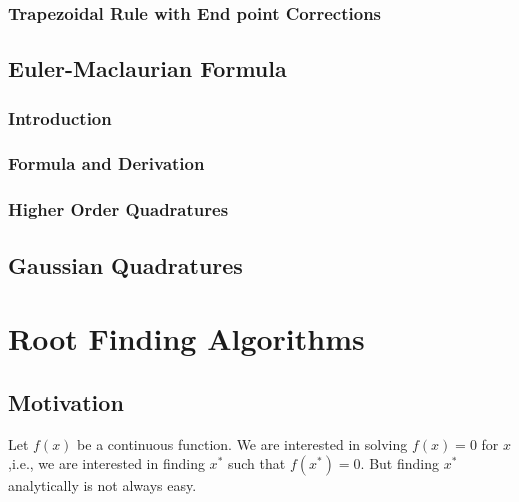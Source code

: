 \documentclass[
]{book}
\begin{document}
\hypertarget{trapezoidal-rule-with-end-point-corrections}{%
\subsection{Trapezoidal Rule with End point Corrections}\label{trapezoidal-rule-with-end-point-corrections}}

\hypertarget{euler-maclaurian-formula}{%
\section{Euler-Maclaurian Formula}\label{euler-maclaurian-formula}}

\hypertarget{introduction-1}{%
\subsection{Introduction}\label{introduction-1}}

\hypertarget{formula-and-derivation}{%
\subsection{Formula and Derivation}\label{formula-and-derivation}}

\hypertarget{higher-order-quadratures}{%
\subsection{Higher Order Quadratures}\label{higher-order-quadratures}}

\hypertarget{gaussian-quadratures}{%
\section{Gaussian Quadratures}\label{gaussian-quadratures}}

\hypertarget{root-finding-algorithms}{%
\chapter{Root Finding Algorithms}\label{root-finding-algorithms}}

\hypertarget{motivation-3}{%
\section{Motivation}\label{motivation-3}}

Let \(f(x)\) be a continuous function. We are interested in solving \(f(x)=0\) for \(x\),i.e., we are interested in finding \(x^*\) such that \(f(x^*)=0\). But finding \(x^*\) analytically is not always easy.
\end{document}
